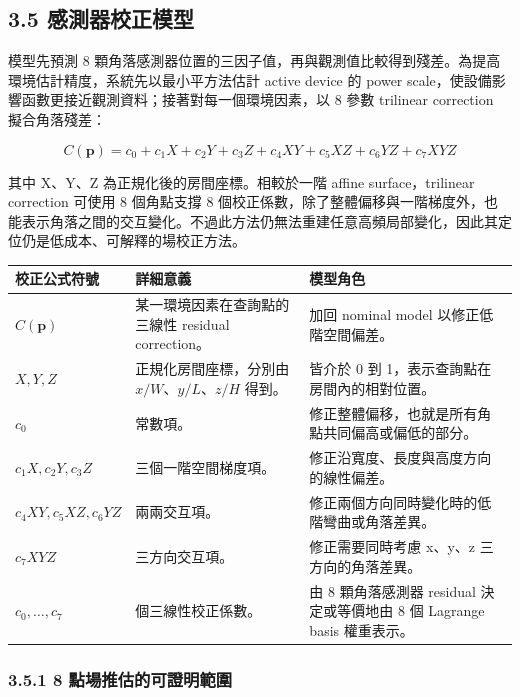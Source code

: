 \documentclass[12pt,a4paper]{article}
\begin{document}
\subsection*{3.5 感測器校正模型}

模型先預測 8 顆角落感測器位置的三因子值，再與觀測值比較得到殘差。為提高環境估計精度，系統先以最小平方法估計 active device 的 power scale，使設備影響函數更接近觀測資料；接著對每一個環境因素，以 8 參數 trilinear correction 擬合角落殘差：


\[
C(\mathbf{p}) = c_0 + c_1 X + c_2 Y + c_3 Z + c_4 XY + c_5 XZ + c_6 YZ + c_7 XYZ
\]

其中 X、Y、Z 為正規化後的房間座標。相較於一階 affine surface，trilinear correction 可使用 8 個角點支撐 8 個校正係數，除了整體偏移與一階梯度外，也能表示角落之間的交互變化。不過此方法仍無法重建任意高頻局部變化，因此其定位仍是低成本、可解釋的場校正方法。


\begin{table}[htbp]
\centering
\footnotesize
\renewcommand{\arraystretch}{1.25}
\begin{tabular}{|>{\raggedright\arraybackslash}p{}|>{\raggedright\arraybackslash}p{}|>{\raggedright\arraybackslash}p{}|}
\hline
\textbf{校正公式符號} & \textbf{詳細意義} & \textbf{模型角色} \\
\hline
$C(\mathbf{p})$ & 某一環境因素在查詢點的三線性 residual correction。 & 加回 nominal model 以修正低階空間偏差。 \\
\hline
$X,Y,Z$ & 正規化房間座標，分別由 $x/W$、$y/L$、$z/H$ 得到。 & 皆介於 0 到 1，表示查詢點在房間內的相對位置。 \\
\hline
$c_0$ & 常數項。 & 修正整體偏移，也就是所有角點共同偏高或偏低的部分。 \\
\hline
$c_1X,c_2Y,c_3Z$ & 三個一階空間梯度項。 & 修正沿寬度、長度與高度方向的線性偏差。 \\
\hline
$c_4XY,c_5XZ,c_6YZ$ & 兩兩交互項。 & 修正兩個方向同時變化時的低階彎曲或角落差異。 \\
\hline
$c_7XYZ$ & 三方向交互項。 & 修正需要同時考慮 x、y、z 三方向的角落差異。 \\
\hline
$c_0,\ldots,c_7$ & 8 個三線性校正係數。 & 由 8 顆角落感測器 residual 決定或等價地由 8 個 Lagrange basis 權重表示。 \\
\hline
\end{tabular}
\end{table}

\subsubsection*{3.5.1 8 點場推估的可證明範圍}
\end{document}
